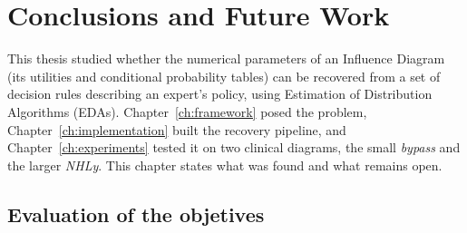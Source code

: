 
\chapter{Conclusions and Future Work}
\label{ch:conclusions}

This thesis studied whether the numerical parameters of an Influence Diagram
(its utilities and conditional probability tables) can be recovered from a set of decision rules describing an expert's policy, using Estimation of
Distribution Algorithms (EDAs). Chapter~\ref{ch:framework} posed the problem,
Chapter~\ref{ch:implementation} built the recovery pipeline, and
Chapter~\ref{ch:experiments} tested it on two clinical diagrams, the small
\emph{bypass} and the larger \emph{NHLy}. This chapter states what was found
and what remains open.

\section{Evaluation of the objetives}
\label{sec:conclusions}

